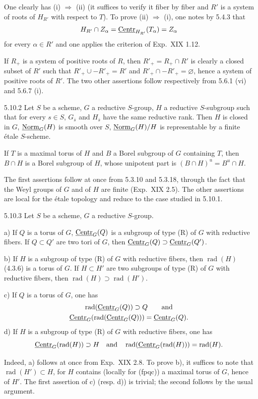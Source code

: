 One clearly has (i) $\Rightarrow$ (ii) (it suffices to verify it fiber by fiber and $R'$ is a system of roots of $H_{R'}$ with respect to $T$). To prove (ii) $\Rightarrow$ (i), one notes by 5.4.3 that
\[
H_{R'}\cap Z_\alpha=\underline{\mathrm{Centr}}_{H_{R'}}(T_\alpha)=Z_\alpha
\]
for every $\alpha\in R'$ and one applies the criterion of Exp.~XIX 1.12.

If $R_+$ is a system of positive roots of $R$, then $R'_+=R_+\cap R'$ is clearly a closed subset of $R'$ such that $R'_+\cup-R'_+=R'$ and $R'_+\cap-R'_+=\varnothing$, hence a system of positive roots of $R'$. The two other assertions follow respectively from 5.6.1 (vi) and 5.6.7 (i).
\begin{corollary}{5.10.2}\label{XXII.5.10.2}
Let $S$ be a scheme, $G$ a reductive $S$-group, $H$ a reductive $S$-subgroup such that for every $s\in S$, $G_{\overline s}$ and $H_{\overline s}$ have the same reductive rank. Then $H$ is closed in $G$, $\underline{\mathrm{Norm}}_G(H)$ is smooth over $S$, $\underline{\mathrm{Norm}}_G(H)/H$ is representable by a finite \'etale $S$-scheme.

If $T$ is a maximal torus of $H$ and $B$ a Borel subgroup of $G$ containing $T$, then $B\cap H$ is a Borel subgroup of $H$, whose unipotent part is $(B\cap H)^u=B^u\cap H$.
\end{corollary}
The first assertions follow at once from 5.3.10 and 5.3.18, through the fact that the Weyl groups of $G$ and of $H$ are finite (Exp.~XIX 2.5). The other assertions are local for the \'etale topology and reduce to the case studied in 5.10.1.
\begin{proposition}{5.10.3}\label{XXII.5.10.3}
Let $S$ be a scheme, $G$ a reductive $S$-group.

a) If $Q$ is a torus of $G$, $\underline{\mathrm{Centr}}_G(Q)$ is a subgroup of type (R) of $G$ with reductive fibers. If $Q\subset Q'$ are two tori of $G$, then $\underline{\mathrm{Centr}}_G(Q)\supset\underline{\mathrm{Centr}}_G(Q')$.

b) If $H$ is a subgroup of type (R) of $G$ with reductive fibers, then $\operatorname{rad}(H)$ (4.3.6) is a torus of $G$. If $H\subset H'$ are two subgroups of type (R) of $G$ with reductive fibers, then $\operatorname{rad}(H)\supset\operatorname{rad}(H')$.

c) If $Q$ is a torus of $G$, one has
\[
\begin{gathered}
\operatorname{rad}(\underline{\mathrm{Centr}}_G(Q))\supset Q\qquad\text{and}\\
\underline{\mathrm{Centr}}_G(\operatorname{rad}(\underline{\mathrm{Centr}}_G(Q)))=\underline{\mathrm{Centr}}_G(Q).
\end{gathered}
\]
d) If $H$ is a subgroup of type (R) of $G$ with reductive fibers, one has
\[
\underline{\mathrm{Centr}}_G(\operatorname{rad}(H))\supset H\quad\text{and}\quad
\operatorname{rad}(\underline{\mathrm{Centr}}_G(\operatorname{rad}(H)))=\operatorname{rad}(H).
\]
\end{proposition}
Indeed, a) follows at once from Exp.~XIX 2.8. To prove b), it suffices to note that $\operatorname{rad}(H')\subset H$, for $H$ contains (locally for (fpqc)) a maximal torus of $G$, hence of $H'$. The first assertion of c) (resp. d)) is trivial; the second follows by the usual argument.

